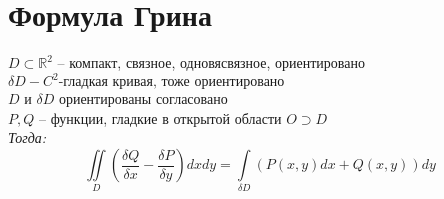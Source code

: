 \documentclass[paper=a4, fontsize=14pt]{report}
\begin{document}
    
    
        \section{Формула Грина}
        $D \subset \mathds{R}^2$ -- компакт, связное, одновясвязное, ориентировано\\$\delta D-C^2\text{-гладкая кривая, тоже ориентировано}$\\
        $D$ и $\delta D$ ориентированы согласовано \\
        $P, Q$ -- функции, гладкие в открытой области $O \supset D$ \\
        \emph{Тогда:} $$\iint\limits_{D}(\frac{\delta Q}{\delta x} - \frac{\delta P}{\delta y})dxdy = \int\limits_{\delta D}(P(x,y)dx + Q(x,y))dy$$
        
\end{document}
